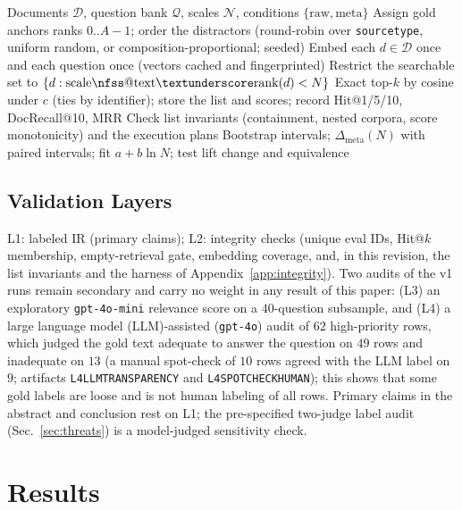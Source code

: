 \documentclass{ieeeaccess}
\makeatletter
\DeclareRobustCommand{\_}{\ifmmode\nfss@text{\textunderscore}\else\textunderscore\allowbreak\fi}
\makeatother
\begin{document}
\begin{algorithm}[t]
\caption{Gold-pinned exact-search scale ladder}
\label{alg:ladder}
\begin{algorithmic}[1]
\Require Documents $\mathcal{D}$, question bank $\mathcal{Q}$, scales $\mathcal{N}$, conditions $\{\mathrm{raw},\mathrm{meta}\}$
\State Assign gold anchors ranks $0..A{-}1$; order the distractors (round-robin over \texttt{source\_type}, uniform random, or composition-proportional; seeded)
\State Embed each $d\in\mathcal{D}$ once and each question once (vectors cached and fingerprinted)
  \State Restrict the searchable set to $\{d:\mathrm{scale\_rank}(d)<N\}$
      \State Exact top-$k$ by cosine under $c$ (ties by identifier); store the list and scores; record Hit@1/5/10, DocRecall@10, MRR
    \EndFor
  \EndFor
\EndFor
\State Check list invariants (containment, nested corpora, score monotonicity) and the execution plans
\State Bootstrap intervals; $\Delta_{\mathrm{meta}}(N)$ with paired intervals; fit $a+b\ln N$; test lift change and equivalence
\end{algorithmic}
\end{algorithm}

\subsection{Validation Layers}
L1: labeled IR (primary claims); L2: integrity checks (unique eval IDs, Hit@$k$ membership, empty-retrieval gate, embedding coverage, and, in this revision, the list invariants and the harness of Appendix~\ref{app:integrity}). Two audits of the v1 runs remain secondary and carry no weight in any result of this paper: (L3) an exploratory \texttt{gpt-4o-mini} relevance score on a $40$-question subsample, and (L4) a large language model (LLM)-assisted (\texttt{gpt-4o}) audit of $62$ high-priority rows, which judged the gold text adequate to answer the question on $49$ rows and inadequate on $13$ (a manual spot-check of $10$ rows agreed with the LLM label on $9$; artifacts \texttt{L4\_LLM\_TRANSPARENCY} and \texttt{L4\_SPOTCHECK\_HUMAN}); this shows that some gold labels are loose and is not human labeling of all rows. Primary claims in the abstract and conclusion rest on L1; the pre-specified two-judge label audit (Sec.~\ref{sec:threats}) is a model-judged sensitivity check.

\section{Results}
\label{sec:results}
\end{document}
